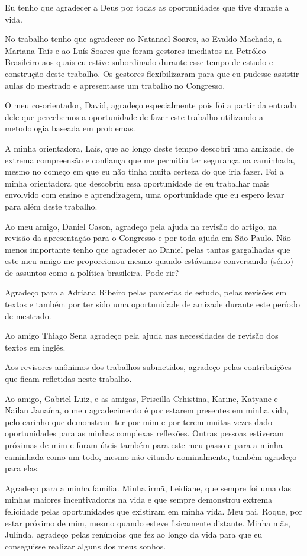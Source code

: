\acknowledgements
Eu tenho que agradecer a Deus por todas as oportunidades
que tive durante a vida.

No trabalho tenho que agradecer ao Natanael Soares,
ao Evaldo Machado, a Mariana Taís e ao Luís Soares que
foram gestores imediatos na Petróleo Brasileiro aos quais
eu estive subordinado durante esse tempo de estudo e
construção deste trabalho.
Os gestores flexibilizaram para que eu pudesse
assistir aulas do mestrado e apresentasse
um trabalho no Congresso.

O meu co-orientador, David, agradeço especialmente
pois foi a partir da entrada dele que percebemos
a oportunidade de fazer este trabalho utilizando a
metodologia baseada em problemas.

A minha orientadora, Laís, que ao longo deste tempo descobri
uma amizade, de extrema compreensão e confiança
que me permitiu ter segurança na caminhada, mesmo no
começo em que eu não tinha muita certeza do que iria
fazer.
Foi a minha orientadora que descobriu essa oportunidade
de eu trabalhar mais envolvido com ensino e aprendizagem,
uma oportunidade que eu espero levar para
além deste trabalho.

Ao meu amigo, Daniel Cason, agradeço pela ajuda na
revisão do artigo, na revisão da apresentação
para o Congresso e por toda ajuda em São Paulo.
Não menos importante tenho que agradecer ao Daniel
pelas tantas gargalhadas que este meu amigo me
proporcionou mesmo quando estávamos conversando
(sério) de assuntos como a política brasileira.
Pode rir?

Agradeço para a Adriana Ribeiro pelas parcerias
de estudo, pelas revisões em textos e também
por ter sido uma oportunidade de amizade durante
este período de mestrado.

Ao amigo Thiago Sena agradeço pela ajuda
nas necessidades de revisão dos textos em
inglês.

Aos revisores anônimos dos trabalhos submetidos,
agradeço pelas contribuições que ficam
refletidas neste trabalho.

Ao amigo, Gabriel Luiz, e as amigas,
Priscilla Crhistina, Karine, Katyane
e Nailan Janaína, o meu agradecimento é
por estarem presentes em minha vida,
pelo carinho que demonstram ter
por mim e por terem muitas vezes dado
oportunidades para as minhas complexas
reflexões.
Outras pessoas estiveram próximas de mim e
foram úteis também para este meu passo e para
a minha caminhada como um todo, mesmo não citando
nominalmente, também agradeço para elas.

Agradeço para a minha família.
Minha irmã, Leidiane, que sempre foi uma das minhas
maiores incentivadoras na vida e que sempre
demonstrou extrema felicidade pelas oportunidades
que existiram em minha vida.
Meu pai, Roque, por estar próximo de mim,
mesmo quando esteve fisicamente distante.
Minha mãe, Julinda, agradeço pelas renúncias que
fez ao longo da vida para que eu conseguisse realizar
alguns dos meus sonhos.
